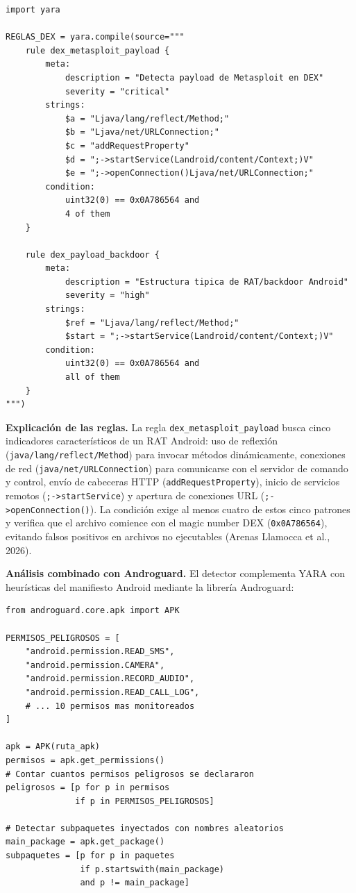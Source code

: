 \documentclass[12pt,a4paper]{article}
\begin{document}
\begin{lstlisting}[caption={Reglas YARA para detección de payload Metasploit en DEX de APK},
                   label=lst:yara_dex]
import yara

REGLAS_DEX = yara.compile(source="""
    rule dex_metasploit_payload {
        meta:
            description = "Detecta payload de Metasploit en DEX"
            severity = "critical"
        strings:
            $a = "Ljava/lang/reflect/Method;"
            $b = "Ljava/net/URLConnection;"
            $c = "addRequestProperty"
            $d = ";->startService(Landroid/content/Context;)V"
            $e = ";->openConnection()Ljava/net/URLConnection;"
        condition:
            uint32(0) == 0x0A786564 and
            4 of them
    }

    rule dex_payload_backdoor {
        meta:
            description = "Estructura tipica de RAT/backdoor Android"
            severity = "high"
        strings:
            $ref = "Ljava/lang/reflect/Method;"
            $start = ";->startService(Landroid/content/Context;)V"
        condition:
            uint32(0) == 0x0A786564 and
            all of them
    }
""")
\end{lstlisting}

\textbf{Explicación de las reglas.} La regla
\texttt{dex\_metasploit\_payload} busca cinco indicadores
característicos de un RAT Android: uso de reflexión
(\texttt{java/lang/reflect/Method}) para invocar métodos dinámicamente,
conexiones de red (\texttt{java/net/URLConnection}) para comunicarse con
el servidor de comando y control, envío de cabeceras HTTP
(\texttt{addRequestProperty}), inicio de servicios remotos
(\texttt{;->startService}) y apertura de conexiones URL
(\texttt{;->openConnection()}). La condición exige al menos cuatro de
estos cinco patrones y verifica que el archivo comience con el magic
number DEX (\texttt{0x0A786564}), evitando falsos positivos en archivos
no ejecutables (Arenas Llamocca et al., 2026).

\textbf{Análisis combinado con Androguard.} El detector complementa
YARA con heurísticas del manifiesto Android mediante la librería
Androguard:

\begin{lstlisting}[caption={Análisis heurístico del AndroidManifest con Androguard},
                   label=lst:androguard]
from androguard.core.apk import APK

PERMISOS_PELIGROSOS = [
    "android.permission.READ_SMS",
    "android.permission.CAMERA",
    "android.permission.RECORD_AUDIO",
    "android.permission.READ_CALL_LOG",
    # ... 10 permisos mas monitoreados
]

apk = APK(ruta_apk)
permisos = apk.get_permissions()
# Contar cuantos permisos peligrosos se declararon
peligrosos = [p for p in permisos
              if p in PERMISOS_PELIGROSOS]

# Detectar subpaquetes inyectados con nombres aleatorios
main_package = apk.get_package()
subpaquetes = [p for p in paquetes
               if p.startswith(main_package)
               and p != main_package]
\end{lstlisting}
\end{document}
